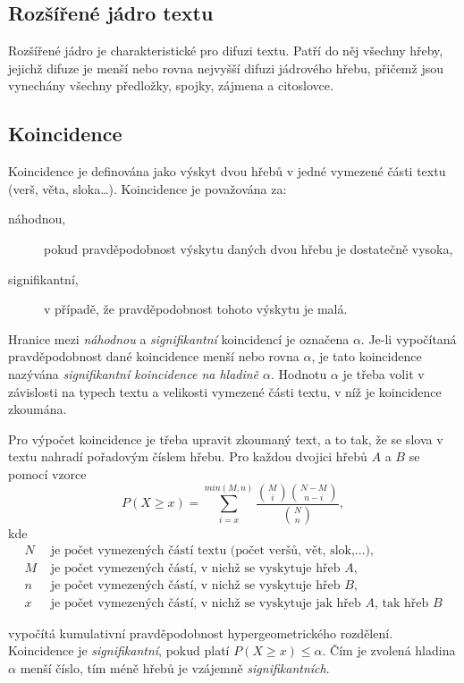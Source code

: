\documentclass[dp.tex]{subfiles}
\begin{document}
\subsection{Rozšířené jádro textu}
Rozšířené jádro je charakteristické pro difuzi textu. Patří do něj všechny hřeby, jejichž difuze je menší nebo rovna nejvyšší difuzi jádrového hřebu, přičemž jsou vynechány všechny předložky, spojky, zájmena a citoslovce.

\subsection{Koincidence}
Koincidence je definována jako výskyt dvou hřebů v jedné vymezené části textu (verš, věta, sloka\ldots). Koincidence je považována za:
\begin{description}
\item[náhodnou,] pokud pravděpodobnost výskytu daných dvou hřebu je dostatečně vysoka,
\item[signifikantní,] v případě, že pravděpodobnost tohoto výskytu je malá.
\end{description}

Hranice mezi \textit{náhodnou} a \textit{signifikantní} koincidencí je označena $\alpha $. Je-li vypočítaná pravděpodobnost dané koincidence menší nebo rovna $\alpha $, je tato koincidence nazývána \textit{signifikantní koincidence na hladině $\alpha $}. Hodnotu $\alpha $ je třeba volit v závislosti na typech textu a velikosti vymezené části textu, v níž je koincidence zkoumána.

Pro výpočet koincidence je třeba upravit zkoumaný text, a to tak, že se slova v textu nahradí pořadovým číslem hřebu. Pro každou dvojici hřebů $A$ a $B$ se pomocí vzorce
\begin{equation}
P(X \geq x)=\sum_{i=x}^{min{\left(  M, n \right) }} \frac{\binom{M}{i}\binom{N-M}{n-i}}{\binom{N}{n}},
\end{equation}
kde 
\begin{align*}
	N & \text{ je počet vymezených částí textu (počet veršů, vět, slok,\ldots),}\\
	M & \text{ je počet vymezených částí, v nichž se vyskytuje hřeb $A$,}\\
	n & \text{ je počet vymezených částí, v nichž se vyskytuje hřeb $B$,}\\
	x & \text{ je počet vymezených částí, v nichž se vyskytuje jak hřeb  $A$, tak hřeb $B$}
\end{align*}  

vypočítá kumulativní pravděpodobnost hypergeometrického rozdělení. Koincidence je \textit{signifikantní}, pokud platí $P(X \geq x)\leq \alpha$. Čím je zvolená hladina $\alpha$ menší číslo, tím méně hřebů je vzájemně \textit{signifikantních}.
\end{document}
